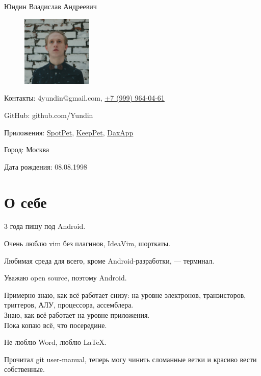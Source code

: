 \documentclass[a4paper,12pt]{article}
\begin{document}
    {\huge Юндин Владислав Андреевич}

    \setlength\intextsep{0pt}
    \begin{figure}
        \includegraphics[width=0.3\textwidth]{avatar_square}
    \end{figure}

    \bigskip
    Контакты: 4yundin@gmail.com, \href{tel:+79999640461}{\color{black}+7 (999) 964-04-61}\par
    GitHub: github.com/Yundin
    
    Приложения: \href{https://play.google.com/store/apps/details?id=com.juntoteam.spotpet}{SpotPet}, \href{https://play.google.com/store/apps/details?id=com.juntoteam.keeppet}{KeepPet}, \href{https://play.google.com/store/apps/details?id=com.app.qavala1}{DaxApp}
    
    Город: Москва\par
    Дата рождения: 08.08.1998\par

    \vspace{7ex}
    \section*{О себе}

    3 года пишу под Android.

    Очень люблю vim без плагинов, IdeaVim, шорткаты. 

    Любимая среда для всего, кроме Android-разработки, --- терминал.

    Уважаю open source, поэтому Android.

    Примерно знаю, как всё работает снизу: на уровне электронов, транзисторов, триггеров, АЛУ, процессора, ассемблера.\\
    Знаю, как всё работает на уровне приложения.\\
    Пока копаю всё, что посередине.

    Не люблю Word, люблю \LaTeX.

    Прочитал git user-manual, теперь могу чинить сломанные ветки и красиво вести собственные.
\end{document}

